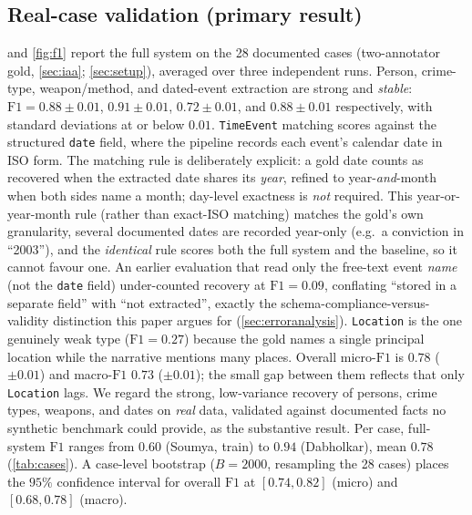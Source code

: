 \documentclass[conference]{IEEEtran}
\newcommand{\node}[1]{\texttt{#1}}
\begin{document}
\subsection{Real-case validation (primary result)}
 and \cref{fig:f1} report the full system on the 28
documented cases (two-annotator gold, \cref{sec:iaa}; \cref{sec:setup}), averaged
over three independent runs. Person,
crime-type, weapon/method, and dated-event extraction are strong and \emph{stable}:
$\mathrm{F1}=0.88\pm0.01$, $0.91\pm0.01$, $0.72\pm0.01$, and $0.88\pm0.01$
respectively, with standard deviations at or below $0.01$. \node{TimeEvent}
matching scores against the structured \texttt{date} field, where the pipeline
records each event's calendar date in ISO form. The matching rule is deliberately
explicit: a gold date counts as recovered when the extracted date shares its
\emph{year}, refined to year-\emph{and}-month when both sides name a month;
day-level exactness is \emph{not} required. This year-or-year-month rule (rather
than exact-ISO matching) matches the gold's own granularity, several documented
dates are recorded year-only (e.g.\ a conviction in ``2003''), and the
\emph{identical} rule scores both the full system and the baseline, so it cannot
favour one. An earlier evaluation that read
only the free-text event \emph{name} (not the \texttt{date} field) under-counted
recovery at $\mathrm{F1}=0.09$, conflating ``stored in a separate field'' with
``not extracted'', exactly the schema-compliance-versus-validity distinction this
paper argues for (\cref{sec:erroranalysis}). \node{Location} is the one genuinely weak type
($\mathrm{F1}=0.27$) because the gold names a single principal location while the
narrative mentions many places. Overall micro-$\mathrm{F1}$ is $0.78$ ($\pm0.01$)
and macro-$\mathrm{F1}$ $0.73$ ($\pm0.01$); the small gap between them reflects that
only \node{Location} lags. We regard the strong, low-variance recovery of persons,
crime types, weapons, and dates on \emph{real} data, validated against documented
facts no synthetic benchmark could provide, as the substantive result. Per case,
full-system $\mathrm{F1}$ ranges from $0.60$ (Soumya, train) to $0.94$ (Dabholkar),
mean $0.78$ (\cref{tab:cases}). A case-level bootstrap ($B{=}2000$, resampling the
28 cases) places the $95\%$ confidence interval for overall $\mathrm{F1}$ at
$[0.74,0.82]$ (micro) and $[0.68,0.78]$ (macro).
\end{document}
